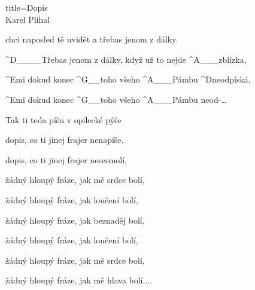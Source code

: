 \begin{song}{title=\centering Dopis \\\normalsize Karel Plíhal  \vspace*{-0.3cm}}
{	chci naposled tě uvidět a třebas jenom z dálky.

	^{D{\color{white}\_\_\_\_}}Třebas jenom z dálky, když už to nejde ^{A{\color{white}\_\_\_}}zblízka,

	^{Emi\,\,}dokud konec ^{G{\color{white}\_\_}}toho všeho ^{A{\color{white}\_\_\_}}Pámbu ^{D}neodpíská,

	^{Emi\,\,}dokud konec ^{G{\color{white}\_\_}}toho všeho ^{A{\color{white}\_\_\_}}Pámbu neod-\elipsa\ldots

	Tak ti teda píšu v opilecké pýše

	dopis, co ti jinej frajer nenapíše,

	dopis, co ti jinej frajer nesesmolí,

	žádný hloupý fráze, jak mě srdce bolí,

	žádný hloupý fráze, jak loučení bolí,

	žádný hloupý fráze, jak beznaděj bolí,

	žádný hloupý fráze, jak loučení bolí,

	žádný hloupý fráze, jak mě srdce bolí,

	žádný hloupý fráze, jak mě hlava bolí.\elipsa.\elipsa.\elipsa.
   



}
\setcounter{Slokočet}{0}
\end{song}
